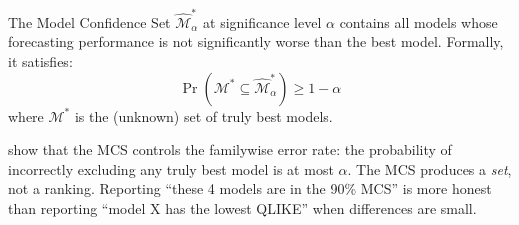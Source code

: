 \begin{definition}
The Model Confidence Set $\widehat{\mathcal{M}}^*_\alpha$ at significance level $\alpha$ contains all models whose forecasting performance is not significantly worse than the best model.
Formally, it satisfies:
\[
\Pr\left(\mathcal{M}^* \subseteq \widehat{\mathcal{M}}^*_\alpha\right) \geq 1 - \alpha
\]
where $\mathcal{M}^*$ is the (unknown) set of truly best models.
\end{definition}

\begin{keyresult}
\citet{HansenLundeNason2011} show that the MCS controls the familywise error rate: the probability of incorrectly excluding any truly best model is at most $\alpha$.
The MCS produces a \emph{set}, not a ranking.
Reporting ``these 4 models are in the 90\% MCS'' is more honest than reporting ``model X has the lowest QLIKE'' when differences are small.
\end{keyresult}

